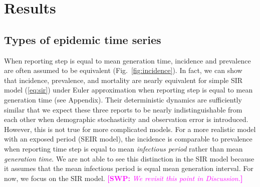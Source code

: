 \documentclass{article}
\newcommand{\eref}[1]{(\ref{eq:#1})}
\newcommand{\fref}[1]{Fig.~\ref{fig:#1}}
\newcommand{\comment}[3]{\textcolor{#1}{\textbf{[#2: }\textsl{#3}\textbf{]}}}
\newcommand{\swp}[1]{\comment{magenta}{SWP}{#1}}
\begin{document}
\section{Results}

\subsection{Types of epidemic time series}

When reporting step is equal to mean generation time, incidence and prevalence are often assumed to be equivalent (\fref{incidence}).
In fact, we can show that incidence, prevalence, and mortality are nearly equivalent for simple SIR model \eref{sir} under Euler approximation when reporting step is equal to mean generation time (see Appendix).
Their deterministic dynamics are sufficiently similar that we expect these three reports to be nearly indistinguishable from each other when demographic stochasticity and observation error is introduced.
However, this is not true for more complicated models.
For a more realistic model with an exposed period (SEIR model), the incidence is comparable to prevalence when reporting time step is equal to mean \emph{infectious period} rather than mean \emph{generation time}.
We are not able to see this distinction in the SIR model because it assumes that the mean infectious period is equal mean generation interval.
For now, we focus on the SIR model. 
\swp{We revisit this point in Discussion.}
\end{document}
